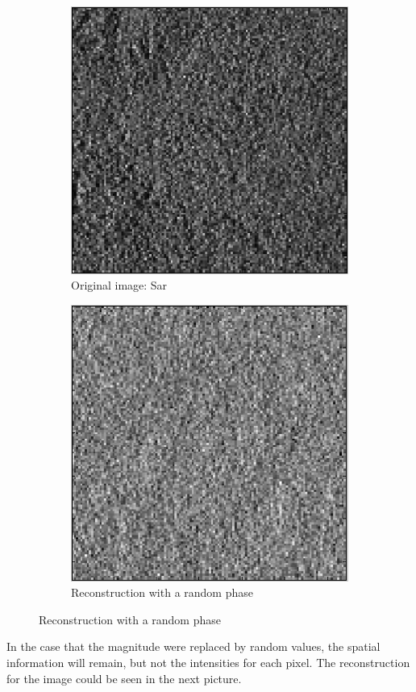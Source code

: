 \documentclass[a4paper, 10pt, conference] {article}
\begin{document}
\begin{figure}[H]
	\centering
	\begin{subfigure}{0.49\textwidth} 
		\centering						
		\includegraphics[scale=0.5]{reportImages/exp1_sar.PNG}
		\caption{Original image: Sar}
	\end{subfigure}
	\begin{subfigure}{0.49\textwidth}
		\centering
		\includegraphics[scale=0.5]{reportImages/exp1_sar_random_phase.PNG}
		\caption{Reconstruction with a random phase}
	\end{subfigure}
	\label{exp1_2}
\end{figure}

In the case that the magnitude were replaced by random values, the spatial information will remain, but not the intensities for each pixel. The reconstruction for the image could be seen in the next picture.
\end{document}
